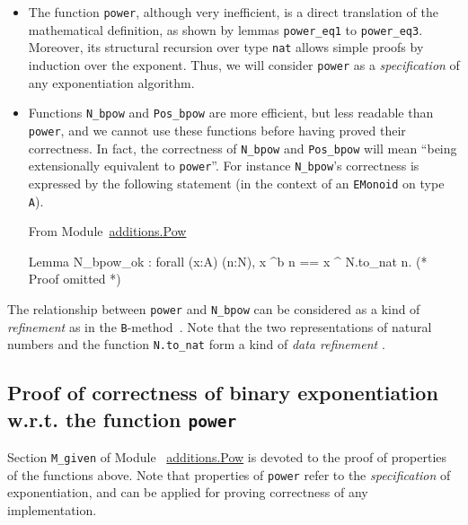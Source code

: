 \begin{itemize}
\item The function \texttt{power}, although very inefficient, is a direct 
translation of the mathematical definition, as shown by  lemmas \texttt{power\_eq1} to \linebreak \texttt{power\_eq3}. Moreover, its structural recursion over type \texttt{nat} allows simple proofs by induction over the exponent. 
Thus, we will consider \texttt{power} as a \emph{specification} of any exponentiation algorithm.

\item Functions \texttt{N\_bpow} and \texttt{Pos\_bpow} are more efficient, but less readable than \texttt{power}, and we cannot use these functions before 
having proved their correctness. In fact, the correctness of 
\texttt{N\_bpow} and \texttt{Pos\_bpow} will mean ``being extensionally equivalent to \texttt{power}''.
For instance \texttt{N\_bpow}'s correctness is expressed by the following
statement (in the context of an \texttt{EMonoid} on type \texttt{A}).


\vspace{4pt}
From Module~\href{../theories/html/additions.Pow.html}{additions.Pow}

\begin{Coqsrc}
Lemma N_bpow_ok : 
forall (x:A) (n:N),   x ^b n  == x ^ N.to_nat n.
(* Proof omitted *)
\end{Coqsrc}

\end{itemize}


The relationship between \texttt{power} and \texttt{N\_bpow} can be considered
as a kind of \emph{refinement} as in the \texttt{B}-method~\cite{b-book}. Note
that the two representations of natural numbers and the function \texttt{N.to\_nat}
form a kind of  \emph{data refinement} \cite{Abrial:2010:MES:1855020, Cohen2013}.



\subsection{Proof of correctness of binary exponentiation w.r.t. the function \texttt{power}}
Section \texttt{M\_given} of Module 
~\href{../theories/html/additions.Pow.html}{additions.Pow} is devoted to the proof 
of properties of the functions above.
Note that properties of \texttt{power} refer to the \emph{specification} of exponentiation, and can be applied for proving correctness of any implementation.

